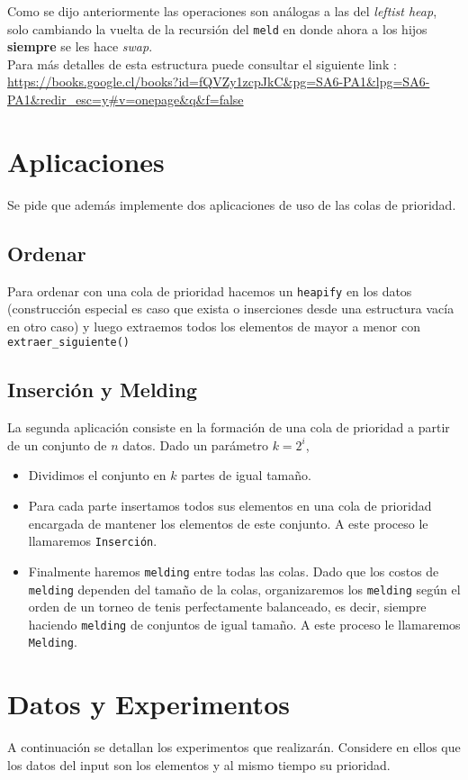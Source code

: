 \documentclass[dcc,uchile]{fcfmcourse}
\begin{document}
Como se dijo anteriormente las operaciones son análogas a las del \textit{leftist heap}, solo cambiando la vuelta de la recursión del \texttt{meld} en donde ahora a los hijos \textbf{siempre} se les hace \textit{swap}.\\
Para más detalles de esta estructura puede consultar el  siguiente link :  \\

\url{https://books.google.cl/books?id=fQVZy1zcpJkC&pg=SA6-PA1&lpg=SA6-PA1&redir_esc=y#v=onepage&q&f=false}

\section{Aplicaciones}
Se pide que además implemente dos aplicaciones de uso de las colas de prioridad.

\subsection*{Ordenar}
Para ordenar con una cola de prioridad hacemos un \texttt{heapify} en los datos (construcción especial es caso que exista o inserciones desde una estructura vacía en otro caso) y luego extraemos todos los elementos de mayor a menor con \texttt{extraer\_siguiente()}

\subsection*{Inserción y Melding}
La segunda aplicación consiste en la formación de una cola de prioridad a partir de un conjunto de $n$ datos. Dado un parámetro $k = 2^i$,
\begin{itemize}
    \item Dividimos el conjunto en $k$ partes de igual tamaño.
    \item Para cada parte insertamos todos sus elementos en una cola de prioridad encargada de mantener los elementos de este conjunto. A este proceso le llamaremos \texttt{Inserción}.
    \item Finalmente haremos \texttt{melding} entre todas las colas. Dado que los costos de \texttt{melding} dependen del tamaño de la colas, organizaremos los \texttt{melding} según el orden de un torneo de tenis perfectamente balanceado, es decir, siempre haciendo \texttt{melding} de conjuntos de igual tamaño. A este proceso le llamaremos \texttt{Melding}.
\end{itemize}

\section{Datos y Experimentos}
A continuación se detallan los experimentos que realizarán. Considere en ellos que los datos del input son los elementos y al mismo tiempo su prioridad.
\end{document}
